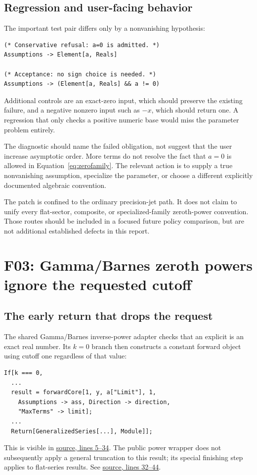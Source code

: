 \documentclass[11pt,letterpaper]{article}
\newcommand{\src}[3]{\href{https://github.com/VladimirReshetnikov/Asymptotic/blob/8e859961d7d37f008b826f3a8cad406460271614/#1\#L#2-L#3}{source, lines #2--#3}}
\newcommand{\code}[1]{\texttt{\detokenize{#1}}}
\begin{document}
\subsection{Regression and user-facing behavior}

The important test pair differs only by a nonvanishing hypothesis:
\begin{lstlisting}
(* Conservative refusal: a=0 is admitted. *)
Assumptions -> Element[a, Reals]

(* Acceptance: no sign choice is needed. *)
Assumptions -> (Element[a, Reals] && a != 0)
\end{lstlisting}
Additional controls are an exact-zero input, which should preserve the existing \code{IndeterminatePower} failure, and a negative nonzero input such as $-x$, which should return one. A regression that only checks a positive numeric base would miss the parameter problem entirely.

The diagnostic should name the failed obligation, not suggest that the user increase asymptotic order. More terms do not resolve the fact that $a=0$ is allowed in Equation~\eqref{eq:zerofamily}. The relevant action is to supply a true nonvanishing assumption, specialize the parameter, or choose a different explicitly documented algebraic convention.

The patch is confined to the ordinary precision-jet path. It does not claim to unify every flat-sector, composite, or specialized-family zeroth-power convention. Those routes should be included in a focused future policy comparison, but are not additional established defects in this report.

\section{F03: Gamma/Barnes zeroth powers ignore the requested cutoff}\label{sec:F03}

\subsection{The early return that drops the request}

The shared Gamma/Barnes inverse-power adapter checks that an explicit \code{cut} is an exact real number. Its $k=0$ branch then constructs a constant forward object using cutoff one regardless of that value:
\begin{lstlisting}
If[k === 0,
  ...
  result = forwardCore[1, y, a["Limit"], 1,
    Assumptions -> ass, Direction -> direction,
    "MaxTerms" -> limit];
  ...
  Return[GeneralizedSeries[...], Module]];
\end{lstlisting}
This is visible in \src{src/Kernel/GammaInverseOperations.wl}{5}{34}. The public power wrapper does not subsequently apply a general truncation to this result; its special finishing step applies to flat-series results.\cite{gammaops,arithmetic} See \src{src/Kernel/SeriesArithmetic.wl}{32}{44}.
\end{document}
